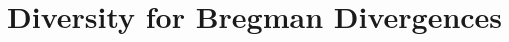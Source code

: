 \documentclass[../main.tex]{subfiles}
\begin{document}



\section{Diversity for Bregman Divergences} \label{sec:bregman-divergences}



\end{document}
